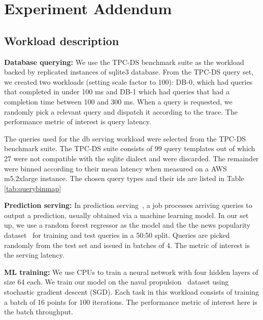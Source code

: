 \section{Experiment Addendum}
\subsection{Workload description}

\textbf{Database querying:}
We use the TPC-DS \cite{tpc-ds} benchmark suite as the workload backed by replicated instances of sqlite3 database. 
From the TPC-DS query set, we created two workloads (setting scale factor to 100): DB-0, which had queries that completed in under 100 ms and DB-1 which had queries that had a completion time between 100 and 300 ms.
When a query is requested, we randomly pick a relevant query and dispatch it
according to the trace. The performance metric of interest is  query latency.

The queries used for the db serving workload were selected from the TPC-DS benchmark suite. The TPC-DS suite consists of 99 query templates out of which 27 were not compatible with the sqlite dialect and were discarded. The remainder were binned according to their mean latency when measured on a AWS m5.2xlarge instance. The chosen query types and their ids are listed in Table \ref{tab:querybinmap}


\textbf{Prediction serving:}
In prediction serving~\cite{crankshaw2017clipper}, a job processes arriving queries
to output a prediction, usually obtained via a machine learning model.
In our set up, we use a random forest regressor as the model and the the news popularity
dataset~\cite{fernandes2015proactive} for training and test queries in a 50:50 split.
Queries are picked randomly from the test set and issued in batches of 4.
The metric of interest is the serving latency.


\textbf{ML training:}
We use CPUs to train a neural network with four hidden layers of size 64 each.
We train our model on the naval propulsion~\cite{coraddu2016machine} dataset using
stochastic gradient descent (SGD).
Each task in this workload consists of training a batch of 16 points for 100 iterations. The performance metric of interest here is the batch throughput.


